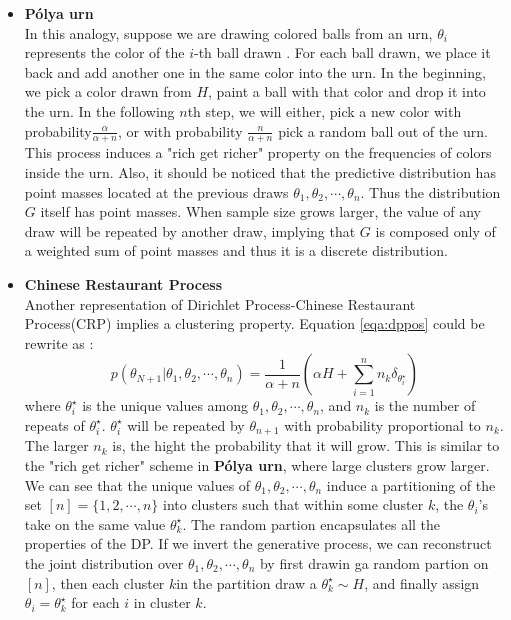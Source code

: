 \documentclass[a4paper,14pt]{article}
\begin{document}
\begin{itemize}
	\item \textbf{P\'{o}lya urn} \\
	In this analogy, suppose we are drawing colored balls from an urn, $\theta_i$ represents the color of the $i$-th ball drawn . For each ball drawn, we place it back  and add another one in the same color into the urn. In  the beginning, we pick a color drawn from $H$, paint a ball with that color and drop it into the urn. In the following $n$th step, we will either, pick a new color with probability$\frac{\alpha}{\alpha+n}$, or with probability $\frac{n}{\alpha+n}$ pick a random ball out of the urn.  This process induces a "rich get richer" property on the frequencies of colors inside the urn. Also, it should be noticed that the predictive distribution has point masses located at the previous draws  $\theta_1,\theta_2,\cdots,\theta_n$. Thus the distribution $G$ itself has point masses. When sample size grows larger, the value of any draw will be repeated by another draw, implying that $G$ is composed only of a weighted sum of point masses and thus  it is a discrete distribution.
	\item \textbf{Chinese Restaurant Process}\\
	Another representation of Dirichlet Process-Chinese Restaurant Process(CRP) implies a clustering property. Equation \ref{eqa:dppos} could be rewrite as :
	\begin{equation}
	p(\theta_{N+1}|\theta_1,\theta_2,\cdots,\theta_n) = \frac{1}{\alpha+n}\left(\alpha H+\sum\limits_{i=1}^{n}n_k\delta_{\theta_i^\star}\right)
	\end{equation}
	where $\theta_i^\star$ is the unique values among $\theta_1,\theta_2,\cdots,\theta_n$, and $n_k$ is the number of repeats of $\theta_i^\star$. $\theta_i^\star$ will be repeated by $\theta_{n+1}$ with probability proportional to $n_k$. The larger $n_k$ is, the hight the probability that it will grow. This is similar to the "rich get richer" scheme in \textbf{P\'{o}lya urn}, where large clusters grow larger. We can see that the unique values  of $\theta_1,\theta_2,\cdots,\theta_n$ induce a partitioning of the set $[n]=\{1,2,\cdots,n\}$ into clusters such that within some cluster $k$, the $\theta_i$'s take on the same value $\theta_k^\star$. The random partion encapsulates all the properties of the DP. If we invert the generative process, we can reconstruct the joint distribution over $\theta_1,\theta_2,\cdots,\theta_n$ by first drawin ga random partion on $[n]$, then each cluster $k$in the partition draw a $\theta_k^\star\sim H$, and finally assign $\theta_i=\theta_k^\star$ for each $i$ in cluster $k$. 
	

\end{itemize}
\end{document}
